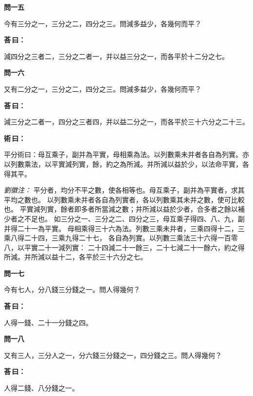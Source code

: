 \documentclass[11pt,a4paper]{article}
\newenvironment{problem}[1][]{%
  \par\vspace{0.6em}\noindent\textcolor{problemcolor}{\textbf{問\ignorespaces#1\unskip}\hspace{0.5em}}%
  \ignorespaces
}{\par\vspace{0.4em}}
\newenvironment{answer}{%
  \par\noindent\textcolor{answercolor}{\textbf{荅\,曰：}}%
  \ignorespaces
}{\par\vspace{0.3em}}
\newenvironment{method}{%
  \par\noindent\textcolor{methodcolor}{\textbf{術\,曰：}}%
  \ignorespaces
}{\par\vspace{0.4em}}
\newenvironment{liuhuicomm}{%
  \par\vspace{0.3em}\noindent\textcolor{commentarycolor}{\small\textit{劉徽注：}}}%
  {\par\vspace{0.5em}}
\begin{document}
\begin{problem}[一五]
今有三分之一，三分之二，四分之三。問減多益少，各幾何而平？
\end{problem}

\begin{answer}
減四分之三者二，三分之二者一，并以益三分之一，而各平於十二分之七。
\end{answer}

\begin{problem}[一六]
又有二分之一，三分之二，四分之三。問減多益少，各幾何而平？
\end{problem}

\begin{answer}
減三分之二者一，四分之三者四，并以益二分之一，而各平於三十六分之二十三。
\end{answer}

\begin{method}
平分術曰：母互乘子，副并為平實，母相乘為法。以列數乘未并者各自為列實。亦以列數乘法，以平實減列實，餘，約之為所減。并所減以益於少，以法命平實，各得其平。
\end{method}

\begin{liuhuicomm}
平分者，均分不平之數，使各相等也。母互乘子，副并為平實者，求其平均之數也。
以列數乘未并者各自為列實者，各以列數乘其未并之數，使可比較也。
平實減列實，餘者即多者所當減之數；并所減以益於少者，合多者之餘以補少者之不足也。
如三分之一、三分之二、四分之三，母互乘子得四、八、九，副并得二十一為平實。
母相乘得三十六為法。列數三乘未并者，三乘四得十二，三乘八得二十四，三乘九得二十七，
各自為列實。以列數三乘法三十六得一百零八，以平實二十一減列實：
二十四減二十一餘三，二十七減二十一餘六，約之得所減。并所減以益十二，各平於三十六分之七。
\end{liuhuicomm}

\begin{problem}[一七]
今有七人，分八錢三分錢之一。問人得幾何？
\end{problem}

\begin{answer}
人得一錢、二十一分錢之四。
\end{answer}

\begin{problem}[一八]
又有三人，三分人之一，分六錢三分錢之一，四分錢之三。問人得幾何？
\end{problem}

\begin{answer}
人得二錢、八分錢之一。
\end{answer}
\end{document}
